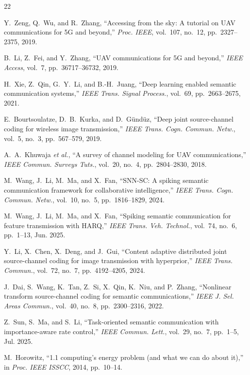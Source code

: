 \documentclass[conference]{IEEEtran}
\begin{document}
\begin{thebibliography}{22}

Y.~Zeng, Q.~Wu, and R.~Zhang, ``Accessing from the sky: A tutorial on UAV communications for 5G and beyond,'' \emph{Proc. IEEE}, vol.~107, no.~12, pp.~2327--2375, 2019.

B.~Li, Z.~Fei, and Y.~Zhang, ``UAV communications for 5G and beyond,'' \emph{IEEE Access}, vol.~7, pp.~36717--36732, 2019.

H.~Xie, Z.~Qin, G.~Y.~Li, and B.-H.~Juang, ``Deep learning enabled semantic communication systems,'' \emph{IEEE Trans. Signal Process.}, vol.~69, pp.~2663--2675, 2021.

E.~Bourtsoulatze, D.~B.~Kurka, and D.~G\"{u}nd\"{u}z, ``Deep joint source-channel coding for wireless image transmission,'' \emph{IEEE Trans. Cogn. Commun. Netw.}, vol.~5, no.~3, pp.~567--579, 2019.

A.~A.~Khuwaja \emph{et al.}, ``A survey of channel modeling for UAV communications,'' \emph{IEEE Commun. Surveys Tuts.}, vol.~20, no.~4, pp.~2804--2830, 2018.

M.~Wang, J.~Li, M.~Ma, and X.~Fan, ``SNN-SC: A spiking semantic communication framework for collaborative intelligence,'' \emph{IEEE Trans. Cogn. Commun. Netw.}, vol.~10, no.~5, pp.~1816--1829, 2024.

M.~Wang, J.~Li, M.~Ma, and X.~Fan, ``Spiking semantic communication for feature transmission with HARQ,'' \emph{IEEE Trans. Veh. Technol.}, vol.~74, no.~6, pp.~1--13, Jun. 2025.

Y.~Li, X.~Chen, X.~Deng, and J.~Gui, ``Content adaptive distributed joint source-channel coding for image transmission with hyperprior,'' \emph{IEEE Trans. Commun.}, vol.~72, no.~7, pp.~4192--4205, 2024.

J.~Dai, S.~Wang, K.~Tan, Z.~Si, X.~Qin, K.~Niu, and P.~Zhang, ``Nonlinear transform source-channel coding for semantic communications,'' \emph{IEEE J. Sel. Areas Commun.}, vol.~40, no.~8, pp.~2300--2316, 2022.

Z.~Sun, S.~Ma, and S.~Li, ``Task-oriented semantic communication with importance-aware rate control,'' \emph{IEEE Commun. Lett.}, vol.~29, no.~7, pp.~1--5, Jul. 2025.

M.~Horowitz, ``1.1 computing's energy problem (and what we can do about it),'' in \emph{Proc. IEEE ISSCC}, 2014, pp.~10--14.


\end{thebibliography}
\end{document}
